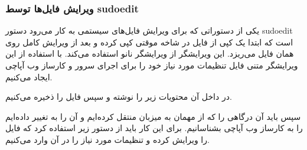 \subsubsection{ویرایش فایل‌ها توسط sudoedit}
یکی از دستوراتی که برای ویرایش فایل‌های سیستمی به کار می‌رود دستور sudoedit است که ابتدا یک کپی از فایل در شاخه موقتی 
 کپی کرده و بعد از ویرایش کامل روی همان فایل می‌ریزد. این ویرایشگر از ویرایشگر نانو استفاده می‌کند. با استفاده از این ویرایشگر متنی فایل تنظیمات مورد نیاز خود را برای اجرای سرور و کارساز وب آپاچی ایجاد می‌کنیم.
\newline
\begin{latin}

    
\end{latin}
در داخل آن محتویات زیر را نوشته و سپس فایل را ذخیره می‌کنیم.
\newline
\begin{latin}
   
    
\end{latin}
سپس باید آن درگاهی را که از مهمان به میزبان منتقل کرده‌ایم و آن را به 
 تغییر داده‌ایم را به کارساز وب آپاچی بشناسانیم. برای این کار باید از دستور زیر استفاده کرد که فایل را ویرایش کرده و تنظیمات مورد نیاز را در آن وارد می‌کنیم.
\newline
\begin{latin}
    
    
\end{latin}


